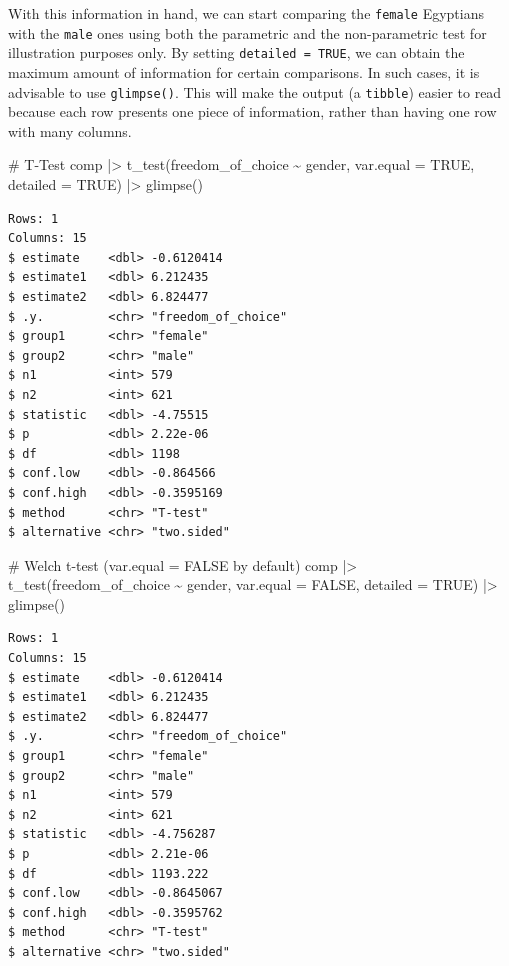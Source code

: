 \documentclass[
  letterpaper,
]{krantz}
\makeatletter
\newenvironment{Shaded}{\begin{snugshade}}{\end{snugshade}}
\newcommand{\AttributeTok}[1]{\textcolor[rgb]{0.40,0.45,0.13}{#1}}
\newcommand{\CommentTok}[1]{\textcolor[rgb]{0.37,0.37,0.37}{#1}}
\newcommand{\ConstantTok}[1]{\textcolor[rgb]{0.56,0.35,0.01}{#1}}
\newcommand{\FunctionTok}[1]{\textcolor[rgb]{0.28,0.35,0.67}{#1}}
\newcommand{\NormalTok}[1]{\textcolor[rgb]{0.00,0.23,0.31}{#1}}
\newcommand{\SpecialCharTok}[1]{\textcolor[rgb]{0.37,0.37,0.37}{#1}}
\newenvironment{kframe}{%
\medskip{}
\setlength{\fboxsep}{.8em}
 \def\at@end@of@kframe{}%
 \ifinner\ifhmode%
  \def\at@end@of@kframe{\end{minipage}}%
  \begin{minipage}{\columnwidth}%
 \fi\fi%
 \def\FrameCommand##1{\hskip\@totalleftmargin \hskip-\fboxsep
 \colorbox{shadecolor}{##1}\hskip-\fboxsep
     \hskip-\linewidth \hskip-\@totalleftmargin \hskip\columnwidth}%
 \MakeFramed {\advance\hsize-\width
   \@totalleftmargin\z@ \linewidth\hsize
   \@setminipage}}%
 {\par\unskip\endMakeFramed%
 \at@end@of@kframe}
\renewenvironment{Shaded}{\begin{kframe}}{\end{kframe}}
\makeatother
\begin{document}
With this information in hand, we can start comparing the
\texttt{female} Egyptians with the \texttt{male} ones using both the
parametric and the non-parametric test for illustration purposes only.
By setting \texttt{detailed\ =\ TRUE}, we can obtain the maximum amount
of information for certain comparisons. In such cases, it is advisable
to use \texttt{glimpse()}. This will make the output (a \texttt{tibble})
easier to read because each row presents one piece of information,
rather than having one row with many columns.

\begin{Shaded}
\begin{Highlighting}[]
\CommentTok{\# T{-}Test}
\NormalTok{comp }\SpecialCharTok{|\textgreater{}} \FunctionTok{t\_test}\NormalTok{(freedom\_of\_choice }\SpecialCharTok{\textasciitilde{}}\NormalTok{ gender,}
                \AttributeTok{var.equal =} \ConstantTok{TRUE}\NormalTok{,}
                \AttributeTok{detailed =} \ConstantTok{TRUE}\NormalTok{) }\SpecialCharTok{|\textgreater{}}
  \FunctionTok{glimpse}\NormalTok{()}
\end{Highlighting}
\end{Shaded}

\begin{verbatim}
Rows: 1
Columns: 15
$ estimate    <dbl> -0.6120414
$ estimate1   <dbl> 6.212435
$ estimate2   <dbl> 6.824477
$ .y.         <chr> "freedom_of_choice"
$ group1      <chr> "female"
$ group2      <chr> "male"
$ n1          <int> 579
$ n2          <int> 621
$ statistic   <dbl> -4.75515
$ p           <dbl> 2.22e-06
$ df          <dbl> 1198
$ conf.low    <dbl> -0.864566
$ conf.high   <dbl> -0.3595169
$ method      <chr> "T-test"
$ alternative <chr> "two.sided"
\end{verbatim}

\begin{Shaded}
\begin{Highlighting}[]
\CommentTok{\# Welch t{-}test (var.equal = FALSE by default)}
\NormalTok{comp }\SpecialCharTok{|\textgreater{}} \FunctionTok{t\_test}\NormalTok{(freedom\_of\_choice }\SpecialCharTok{\textasciitilde{}}\NormalTok{ gender,}
                \AttributeTok{var.equal =} \ConstantTok{FALSE}\NormalTok{,}
                \AttributeTok{detailed =} \ConstantTok{TRUE}\NormalTok{) }\SpecialCharTok{|\textgreater{}}
  \FunctionTok{glimpse}\NormalTok{()}
\end{Highlighting}
\end{Shaded}

\begin{verbatim}
Rows: 1
Columns: 15
$ estimate    <dbl> -0.6120414
$ estimate1   <dbl> 6.212435
$ estimate2   <dbl> 6.824477
$ .y.         <chr> "freedom_of_choice"
$ group1      <chr> "female"
$ group2      <chr> "male"
$ n1          <int> 579
$ n2          <int> 621
$ statistic   <dbl> -4.756287
$ p           <dbl> 2.21e-06
$ df          <dbl> 1193.222
$ conf.low    <dbl> -0.8645067
$ conf.high   <dbl> -0.3595762
$ method      <chr> "T-test"
$ alternative <chr> "two.sided"
\end{verbatim}
\end{document}
